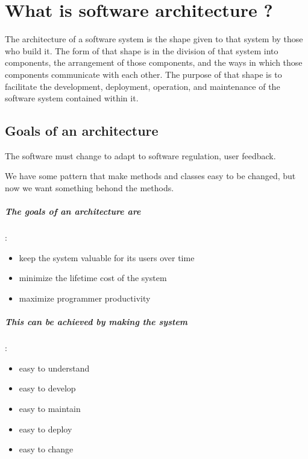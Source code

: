 \chapter{What is software architecture ?}

The architecture of a software system is the shape given to that system by those
who build it. The form of that shape is in the division of that system into
components, the arrangement of those components, and the ways in which those
components communicate with each other. The purpose of that shape is to
facilitate the development, deployment, operation, and maintenance of the
software system contained within it.

\section{Goals of an architecture}

The software must change to adapt to software regulation, user feedback.

We have some pattern that make methods and classes easy to be changed, but now
we want something behond the methods.





\begin{flushleft}
  \begin{minipage}[t]{0.45\linewidth}
    \raggedright
    \paragraph{The goals of an architecture are}:
    \begin{itemize}
      \setlength{\itemsep}{0pt}
      \item keep the system valuable for its users over time
      \item minimize the lifetime cost of the system
      \item maximize programmer productivity
    \end{itemize}
  \end{minipage}%
  \hfill
  \begin{minipage}[t]{0.45\linewidth}
    \raggedright
    \paragraph{This can be achieved by making the system}:

    \begin{itemize}
      \setlength{\itemsep}{0pt}
      \item easy to understand
      \item easy to develop
      \item easy to maintain
      \item easy to deploy
      \item easy to change
    \end{itemize}
  \end{minipage}
\end{flushleft}


